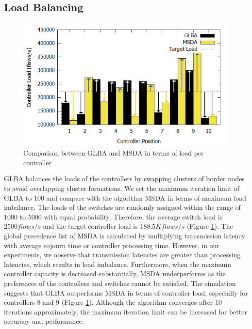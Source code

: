 \documentclass[a4paper,fleqn]{cas-dc}
\begin{document}
\subsection{Load Balancing} \label{LoadAnalysis}

\begin{figure}
	\centering
	\includegraphics[width=\linewidth]{Images/load_comparison_edit.png}
	\caption{Comparison between GLBA and MSDA in terms of load per controller} \label{fig:Lcomparison}
\end{figure}

\noindent GLBA balances the loads of the controllers by swapping clusters of border nodes to avoid overlapping cluster formations. We set the maximum iteration limit of GLBA to $100$ and compare with the algorithm MSDA \cite{filali2018sdn, fragiadakis2016matching} in terms of maximum load imbalance. The loads of the switches are randomly assigned within the range of $1000$ to $5000$ with equal probability. Therefore, the average switch load is $2500 flows/s$ and the target controller load is $188.5K flows/s$ (Figure \ref{fig:Lcomparison}). The global precedence list of MSDA is calculated by multiplying transmission latency with average sojourn time or controller processing time. However, in our experiments, we observe that transmission latencies are greater than processing latencies, which results in load imbalance. Furthermore, when the maximum controller capacity is decreased substantially, MSDA underperforms as the preferences of the controllers and switches cannot be satisfied. The simulation suggests that GLBA outperforms MSDA in terms of controller load, especially for controllers 8 and 9 (Figure \ref{fig:Lcomparison}). Although the algorithm converges after 10 iterations approximately, the maximum iteration limit can be increased for better accuracy and performance.
\end{document}
